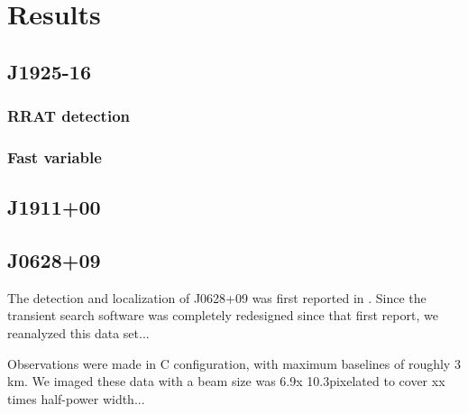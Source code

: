 \section{Results}

\subsection{J1925-16}
\subsubsection{RRAT detection}


\subsubsection{Fast variable}


\subsection{J1911+00}

\subsection{J0628+09}

The detection and localization of J0628+09 was first reported in \cite{Law_2012}. Since the transient search software was completely redesigned since that first report, we reanalyzed this data set...

Observations were made in C configuration, with maximum baselines of roughly 3 km. We imaged these data with a beam size was 6.9\arcsec x 10.3\arcsec pixelated to cover xx times half-power width...
  
  
  